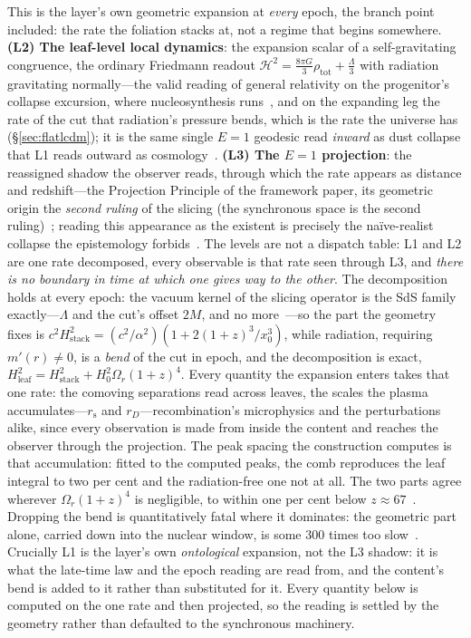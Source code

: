 \documentclass[11pt,a4paper]{article}
\theoremstyle{plain}
\theoremstyle{definition}
\theoremstyle{remark}
\newcommand{\rs}{r_{\mathrm{s}}}
\begin{document}
This is the layer's own geometric expansion at \emph{every} epoch, the branch point included: the rate the foliation stacks at, not a regime that begins somewhere. \textbf{(L2) The leaf-level local dynamics}: the expansion scalar of a self-gravitating congruence, the ordinary Friedmann readout $\mathcal H^2=\tfrac{8\pi G}{3}\rho_{\mathrm{tot}}+\tfrac{\Lambda}{3}$ with radiation gravitating normally---the valid reading of general relativity on the progenitor's collapse excursion, where nucleosynthesis runs~\cite{JanzenCosmogenesis}, and on the expanding leg the rate of the cut that radiation's pressure bends, which is the rate the universe has (\S\ref{sec:flatlcdm}); it is the same single $E{=}1$ geodesic read \emph{inward} as dust collapse that L1 reads outward as cosmology~\cite{JanzenOperator,JanzenBHcausality}. \textbf{(L3) The $E=1$ projection}: the reassigned shadow the observer reads, through which the rate appears as distance and redshift---the Projection Principle of the framework paper, its geometric origin the \emph{second ruling} of the slicing (the synchronous space is the second ruling)~\cite{JanzenCRframework,JanzenOperator}; reading this appearance as the existent is precisely the naïve-realist collapse the epistemology forbids~\cite{JanzenShadowExistence}. The levels are not a dispatch table: L1 and L2 are one rate decomposed, every observable is that rate seen through L3, and \emph{there is no boundary in time at which one gives way to the other}. The decomposition holds at every epoch: the vacuum kernel of the slicing operator is the SdS family exactly---$\Lambda$ and the cut's offset $2M$, and no more~\cite{JanzenOperator}---so the part the geometry fixes is $c^{2}H_{\text{stack}}^{2}=(c^{2}/\alpha^{2})(1+2(1+z)^{3}/x_0^{3})$, while radiation, requiring $m'(r)\neq0$, is a \emph{bend} of the cut in epoch, and the decomposition is exact, $H_{\text{leaf}}^{2}=H_{\text{stack}}^{2}+H_0^{2}\Omega_r(1+z)^{4}$. Every quantity the expansion enters takes that one rate: the comoving separations read across leaves, the scales the plasma accumulates---$\rs$ and $r_D$---recombination's microphysics and the perturbations alike, since every observation is made from inside the content and reaches the observer through the projection. The peak spacing the construction computes is that accumulation: fitted to the computed peaks, the comb reproduces the leaf integral to two per cent and the radiation-free one not at all. The two parts agree wherever $\Omega_r(1+z)^4$ is negligible, to within one per cent below $z\approx67$~\cite{JanzenCRframework,JanzenBHcausality}. Dropping the bend is quantitatively fatal where it dominates: the geometric part alone, carried down into the nuclear window, is some $300$ times too slow~\cite{JanzenCosmogenesis}. Crucially L1 is the layer's own \emph{ontological} expansion, not the L3 shadow: it is what the late-time law and the epoch reading are read from, and the content's bend is added to it rather than substituted for it. Every quantity below is computed on the one rate and then projected, so the reading is settled by the geometry rather than defaulted to the synchronous machinery.
\end{document}
